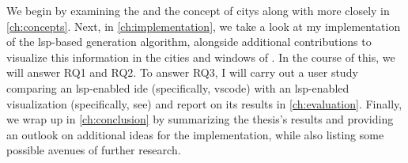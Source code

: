 \documentclass[../thesis]{subfiles}
\begin{document}
We begin by examining the  and the concept of \glspl{city} along with \SEE{} more closely in \cref{ch:concepts}.
Next, in \cref{ch:implementation}, we take a look at my implementation of the \gls{lsp}-based  generation algorithm, alongside additional contributions to visualize this information in the cities and \glspl{window} of \SEE{}.
In the course of this, we will answer \textsf{RQ1} and \textsf{RQ2}.
To answer \textsf{RQ3}, I will carry out a user study comparing an \gls{lsp}-enabled \gls{ide} (specifically, \gls{vscode}) with an \gls{lsp}-enabled  visualization (specifically, \gls{see}) and report on its results in \cref{ch:evaluation}.
Finally, we wrap up in \cref{ch:conclusion} by summarizing the thesis's results and providing an outlook on additional ideas for the implementation, while also listing some possible avenues of further research.

\newpage
\vspace*{\fill}
\end{document}
